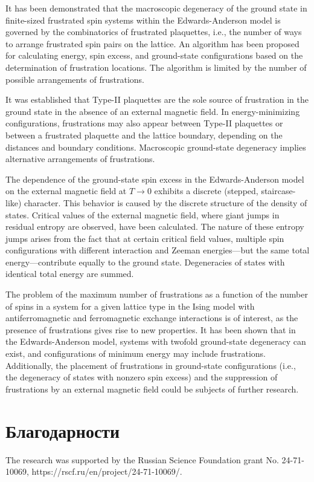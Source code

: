 \documentclass[utf8, babel, sor, jor, amsmath, amssymb, reprint]{elsarticle} %
\begin{document}
It has been demonstrated that the macroscopic degeneracy of the ground state in finite-sized frustrated spin systems within the Edwards-Anderson model is governed by the combinatorics of frustrated plaquettes, i.e., the number of ways to arrange frustrated spin pairs on the lattice. An algorithm has been proposed for calculating energy, spin excess, and ground-state configurations based on the determination of frustration locations. The algorithm is limited by the number of possible arrangements of frustrations.

It was established that Type-II plaquettes are the sole source of frustration in the ground state in the absence of an external magnetic field. In energy-minimizing configurations, frustrations may also appear between Type-II plaquettes or between a frustrated plaquette and the lattice boundary, depending on the distances and boundary conditions. Macroscopic ground-state degeneracy implies alternative arrangements of frustrations.

The dependence of the ground-state spin excess in the Edwards-Anderson model on the external magnetic field at $T \to 0$ exhibits a discrete (stepped, staircase-like) character. This behavior is caused by the discrete structure of the density of states. Critical values of the external magnetic field, where giant jumps in residual entropy are observed, have been calculated. The nature of these entropy jumps arises from the fact that at certain critical field values, multiple spin configurations with different interaction and Zeeman energies—but the same total energy—contribute equally to the ground state. Degeneracies of states with identical total energy are summed.

The problem of the maximum number of frustrations as a function of the number of spins in a system for a given lattice type in the Ising model with antiferromagnetic and ferromagnetic exchange interactions is of interest, as the presence of frustrations gives rise to new properties. It has been shown that in the Edwards-Anderson model, systems with twofold ground-state degeneracy can exist, and configurations of minimum energy may include frustrations. Additionally, the placement of frustrations in ground-state configurations (i.e., the degeneracy of states with nonzero spin excess) and the suppression of frustrations by an external magnetic field could be subjects of further research.


\section{Благодарности}

The research was supported by the Russian Science Foundation grant No. 24-71-10069, https://rscf.ru/en/project/24-71-10069/.


\end{document}
